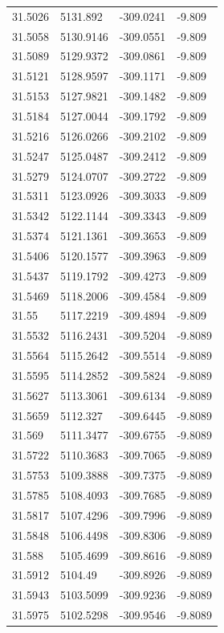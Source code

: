 \begin{table}[H]
\begin{tabular}{llll}
31.5026 & 5131.892 & -309.0241 & -9.809 \\
31.5058 & 5130.9146 & -309.0551 & -9.809 \\
31.5089 & 5129.9372 & -309.0861 & -9.809 \\
31.5121 & 5128.9597 & -309.1171 & -9.809 \\
31.5153 & 5127.9821 & -309.1482 & -9.809 \\
31.5184 & 5127.0044 & -309.1792 & -9.809 \\
31.5216 & 5126.0266 & -309.2102 & -9.809 \\
31.5247 & 5125.0487 & -309.2412 & -9.809 \\
31.5279 & 5124.0707 & -309.2722 & -9.809 \\
31.5311 & 5123.0926 & -309.3033 & -9.809 \\
31.5342 & 5122.1144 & -309.3343 & -9.809 \\
31.5374 & 5121.1361 & -309.3653 & -9.809 \\
31.5406 & 5120.1577 & -309.3963 & -9.809 \\
31.5437 & 5119.1792 & -309.4273 & -9.809 \\
31.5469 & 5118.2006 & -309.4584 & -9.809 \\
31.55 & 5117.2219 & -309.4894 & -9.809 \\
31.5532 & 5116.2431 & -309.5204 & -9.8089 \\
31.5564 & 5115.2642 & -309.5514 & -9.8089 \\
31.5595 & 5114.2852 & -309.5824 & -9.8089 \\
31.5627 & 5113.3061 & -309.6134 & -9.8089 \\
31.5659 & 5112.327 & -309.6445 & -9.8089 \\
31.569 & 5111.3477 & -309.6755 & -9.8089 \\
31.5722 & 5110.3683 & -309.7065 & -9.8089 \\
31.5753 & 5109.3888 & -309.7375 & -9.8089 \\
31.5785 & 5108.4093 & -309.7685 & -9.8089 \\
31.5817 & 5107.4296 & -309.7996 & -9.8089 \\
31.5848 & 5106.4498 & -309.8306 & -9.8089 \\
31.588 & 5105.4699 & -309.8616 & -9.8089 \\
31.5912 & 5104.49 & -309.8926 & -9.8089 \\
31.5943 & 5103.5099 & -309.9236 & -9.8089 \\
31.5975 & 5102.5298 & -309.9546 & -9.8089 \\

\end{tabular}
\end{table}
